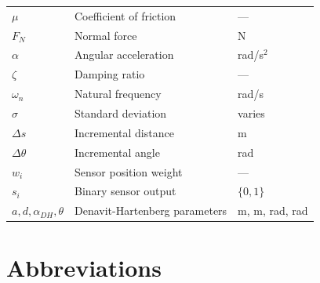 \documentclass[12pt,a4paper,oneside]{report}
\begin{document}
\begin{longtable}{p{2.5cm} p{8cm} p{3cm}}
$\mu$ & Coefficient of friction & --- \\
$F_N$ & Normal force & N \\
$\alpha$ & Angular acceleration & rad/s$^2$ \\
$\zeta$ & Damping ratio & --- \\
$\omega_n$ & Natural frequency & rad/s \\
$\sigma$ & Standard deviation & varies \\
$\Delta s$ & Incremental distance & m \\
$\Delta\theta$ & Incremental angle & rad \\
$w_i$ & Sensor position weight & --- \\
$s_i$ & Binary sensor output & $\{0,1\}$ \\
$a, d, \alpha_{DH}, \theta$ & Denavit-Hartenberg parameters & m, m, rad, rad \\
\bottomrule
\end{longtable}

\section*{Abbreviations}
\end{document}
